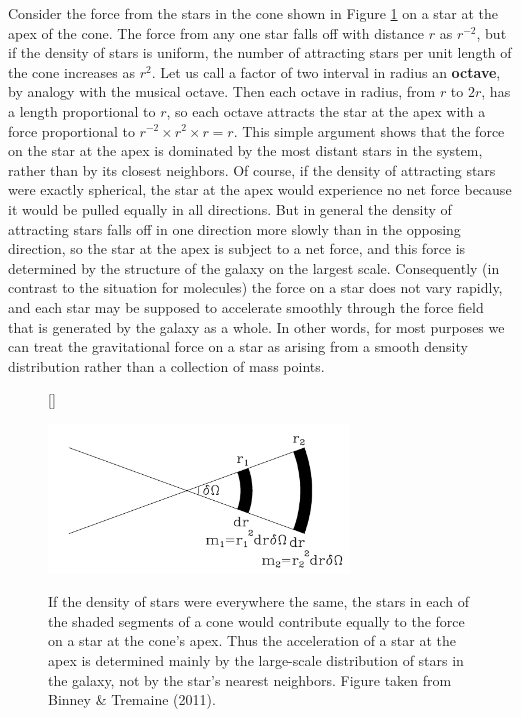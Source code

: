 \documentclass[a4paper,10pt]{article}
\begin{document}
Consider the force from the stars in the cone shown in Figure \ref{fig:apex} on a star at the apex of the cone. The force from any one star falls off with distance $r$ as $r^{-2}$, but if the density of stars is uniform, the number of attracting stars per unit length of the cone increases as $r^2$. Let us call a factor of two interval in radius an \textbf{octave}, by analogy with the musical octave. Then each octave in radius, from $r$ to $2r$, has a length proportional to $r$, so each octave attracts the star at the apex with a force proportional to $r^{-2} \times r^2 \times r = r$. This simple argument shows that the force on the star at the apex is dominated by the most distant stars in the system, rather than by its closest neighbors. Of course, if the density of attracting stars were exactly spherical, the star at the apex would experience no net force because it would be pulled equally in all directions. But in general the density of attracting stars falls off in one direction more slowly than in the opposing direction, so the star at the apex is subject to a net force, and this force is determined by the structure of the galaxy on the largest scale. Consequently (in contrast to the situation for molecules) the force on a star does not vary rapidly, and each star may be supposed to accelerate smoothly through the force field that is generated by the galaxy as a whole. In other words, for most purposes we can treat the gravitational force on a star as arising from a smooth density distribution rather than a collection of mass points.

\begin{figure}[h]
    [\FBwidth]
    {\caption{\footnotesize{If the density of stars were everywhere the same, the stars in each of the shaded segments of a cone would contribute equally to the force on a star at the cone's apex. Thus the acceleration of a star at the apex is determined mainly by the large-scale distribution of stars in the galaxy, not by the star's nearest neighbors. Figure taken from Binney \& Tremaine (2011).}} 
    \label{fig:apex}}
    {\includegraphics[width=8cm]{figures/apex.png}}
\end{figure}
\end{document}
